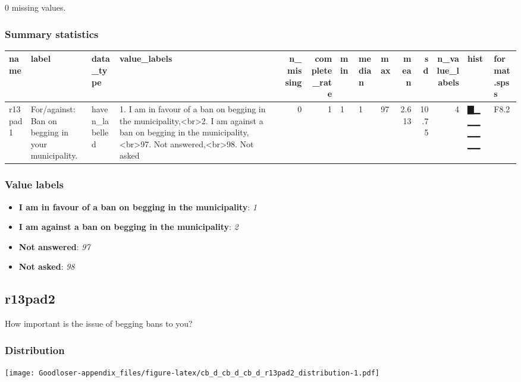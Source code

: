 \documentclass[
]{book}
\providecommand{\tightlist}{%
  \setlength{\itemsep}{0pt}\setlength{\parskip}{0pt}}
\begin{document}
0 missing values.

\hypertarget{r13pad1_summary}{%
\subsubsection{Summary statistics}\label{r13pad1_summary}}

\begin{tabular}{l|l|l|l|r|r|l|l|l|r|r|r|l|l}
\hline
name & label & data_type & value_labels & n_missing & complete_rate & min & median & max & mean & sd & n_value_labels & hist & format.spss\\
\hline
r13pad1 & For/against: Ban on begging in your municipality. & haven_labelled & 1. I am in favour of a ban on begging in the municipality,<br>2. I am against a ban on begging in the municipality,<br>97. Not answered,<br>98. Not asked & 0 & 1 & 1 & 1 & 97 & 2.613 & 10.75 & 4 & ▇▁▁▁▁▁▁▁ & F8.2\\
\hline
\end{tabular}

\hypertarget{r13pad1_labels}{%
\subsubsection{Value labels}\label{r13pad1_labels}}

\begin{itemize}
\tightlist
\item
  \textbf{I am in favour of a ban on begging in the municipality}: \emph{1}
\item
  \textbf{I am against a ban on begging in the municipality}: \emph{2}
\item
  \textbf{Not answered}: \emph{97}
\item
  \textbf{Not asked}: \emph{98}
\end{itemize}

\hypertarget{r13pad2}{%
\subsection{r13pad2}\label{r13pad2}}

How important is the issue of begging bans to you?

\hypertarget{r13pad2_distribution}{%
\subsubsection{Distribution}\label{r13pad2_distribution}}

\texttt{[image: Goodloser-appendix\_files/figure-latex/cb\_d\_cb\_d\_cb\_d\_r13pad2\_distribution-1.pdf]}
\end{document}
